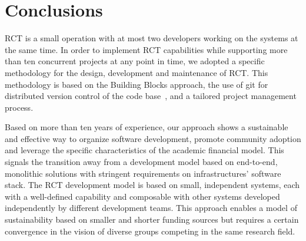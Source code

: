 \documentclass[preprint,12pt, a4paper]{elsarticle}
\begin{document}
\section{Conclusions}\label{sec:conclusions}

RCT is a small operation with at most two developers working on the systems at
the same time. In order to implement RCT capabilities while supporting more than
ten concurrent projects at any point in time, we adopted a specific methodology
for the design, development and maintenance of RCT\@. This methodology is based
on the Building Blocks approach, the use of git for distributed version control
of the code base~\cite{github-rct}, and a tailored project management process.

Based on more than ten years of experience, our approach shows a sustainable and
effective way to organize software development, promote community adoption and
leverage the specific characteristics of the academic financial model. This
signals the transition away from a development model based on end-to-end,
monolithic solutions with stringent requirements on infrastructures' software
stack. The RCT development model is based on small, independent systems, each
with a well-defined capability and composable with other systems developed
independently by different development teams. This approach enables a model of
sustainability based on smaller and shorter funding sources but requires a
certain convergence in the vision of diverse groups competing in the same
research field.


\end{document}
